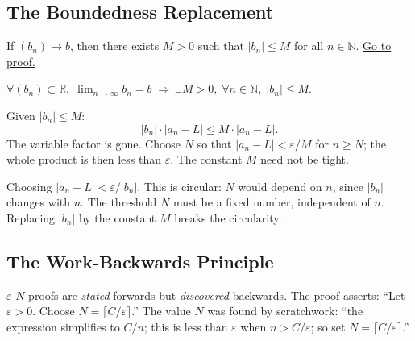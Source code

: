 \subsection*{The Boundedness Replacement}
\label{subsec:boundedness-replacement}

\begin{proposition}
\label{prop:convergent-bounded}
If $(b_n)\to b$, then there exists $M>0$ such that $|b_n|\leq M$ for all
$n\in\mathbb{N}$.
\hyperref[prf:convergent-bounded]{Go to proof.}
\end{proposition}

\begin{remark*}
\end{remark*}


\begin{remark}
$\forall(b_n)\subset\mathbb{R},\;\lim_{n\to\infty}b_n=b
\;\Rightarrow\;
\exists M>0,\;\forall n\in\mathbb{N},\;|b_n|\leq M$.
\end{remark}

\begin{remark}
Given $|b_n|\leq M$:
\[
  |b_n|\cdot|a_n-L|\leq M\cdot|a_n-L|.
\]
The variable factor is gone. Choose $N$ so that $|a_n-L|<\varepsilon/M$ for
$n\geq N$; the whole product is then less than $\varepsilon$. The constant $M$
need not be tight.
\end{remark}

\begin{remark}
Choosing $|a_n-L|<\varepsilon/|b_n|$. This is circular: $N$ would depend on
$n$, since $|b_n|$ changes with $n$. The threshold $N$ must be a fixed
number, independent of $n$. Replacing $|b_n|$ by the constant $M$ breaks
the circularity.
\end{remark}

\subsection*{The Work-Backwards Principle}
\label{subsec:work-backwards}

$\varepsilon$-$N$ proofs are \emph{stated} forwards but \emph{discovered}
backwards. The proof asserts: ``Let $\varepsilon>0$. Choose
$N=\lceil C/\varepsilon\rceil$.'' The value $N$ was found by scratchwork:
``the expression simplifies to $C/n$; this is less than $\varepsilon$ when
$n>C/\varepsilon$; so set $N=\lceil C/\varepsilon\rceil$.''

